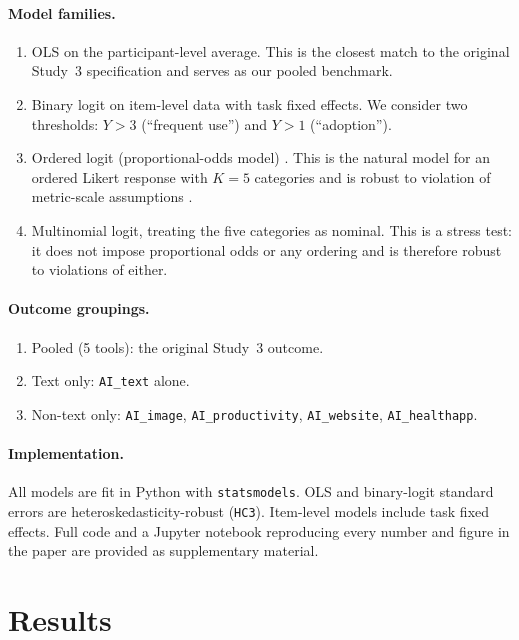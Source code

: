 \documentclass[11pt]{article}
\begin{document}
\paragraph{Model families.}
\begin{enumerate}
  \item OLS on the participant-level average. This is the closest
    match to the original Study~3 specification and serves as our pooled
    benchmark.
  \item Binary logit on item-level data with task fixed effects. We
    consider two thresholds: $Y > 3$ (``frequent use'') and $Y > 1$
    (``adoption'').
  \item Ordered logit (proportional-odds model)
    \citep{mccullagh1980regression}. This is the natural model for an
    ordered Likert response with $K = 5$ categories and is robust to violation
    of metric-scale assumptions \citep{liddell2018analyzing}.
  \item Multinomial logit, treating the five categories as nominal.
    This is a stress test: it does not impose proportional odds or any
    ordering and is therefore robust to violations of either.
\end{enumerate}

\paragraph{Outcome groupings.}
\begin{enumerate}
  \item Pooled (5 tools): the original Study~3 outcome.
  \item Text only: \texttt{AI\_text} alone.
  \item Non-text only: \texttt{AI\_image},
    \texttt{AI\_productivity}, \texttt{AI\_website}, \texttt{AI\_healthapp}.
\end{enumerate}

\paragraph{Implementation.} All models are fit in Python with
\texttt{statsmodels}. OLS and binary-logit standard errors are
heteroskedasticity-robust (\texttt{HC3}). Item-level models include
task fixed effects. Full code and a Jupyter notebook reproducing every number
and figure in the paper are provided as supplementary material.

\section{Results}
\end{document}
